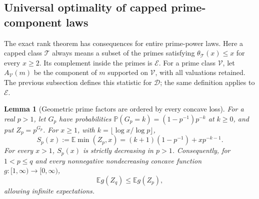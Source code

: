 \documentclass[11pt]{article}
\newtheorem{lemma}[theorem]{Lemma}
\theoremstyle{definition}
\begin{document}
\subsection{Universal optimality of capped prime-component laws}
\label{sec:geometric-cap-extremality}

The exact rank theorem has consequences for entire prime-power laws.
Here a capped class $\mathcal T$ always means a subset of the primes
satisfying $\theta_{\mathcal T}(x)\le x$ for every $x\ge2$.
Its complement inside the primes is $\mathcal E$.
For a prime class $\mathcal V$, let $A_{\mathcal V}(m)$ be the
component of $m$ supported on $\mathcal V$, with all valuations retained.
The previous subsection defines this statistic for $\mathcal D$;
the same definition applies to $\mathcal E$.

\begin{lemma}[Geometric prime factors are ordered by every concave loss]
\label{lem:geometric-prime-concave-order}
For a real $p>1$, let $G_p$ have probabilities
$\mathbb P(G_p=k)=(1-p^{-1})p^{-k}$ at $k\ge0$, and put $Z_p=p^{G_p}$.
For $x\ge1$, with $k=\lfloor\log x/\log p\rfloor$,
\begin{equation}
 S_p(x):=\mathbb E\min(Z_p,x)
                =(k+1)(1-p^{-1})+xp^{-k-1}.
 \label{eq:geometric-prime-capped-mean}
\end{equation}
For every $x>1$, $S_p(x)$ is strictly decreasing in $p>1$.
Consequently, for $1<p\le q$ and every nonnegative nondecreasing
concave function $g:[1,\infty)\to[0,\infty)$,
\[
                            \mathbb E g(Z_q)\le\mathbb E g(Z_p),
\]
allowing infinite expectations.
\end{lemma}
\end{document}
